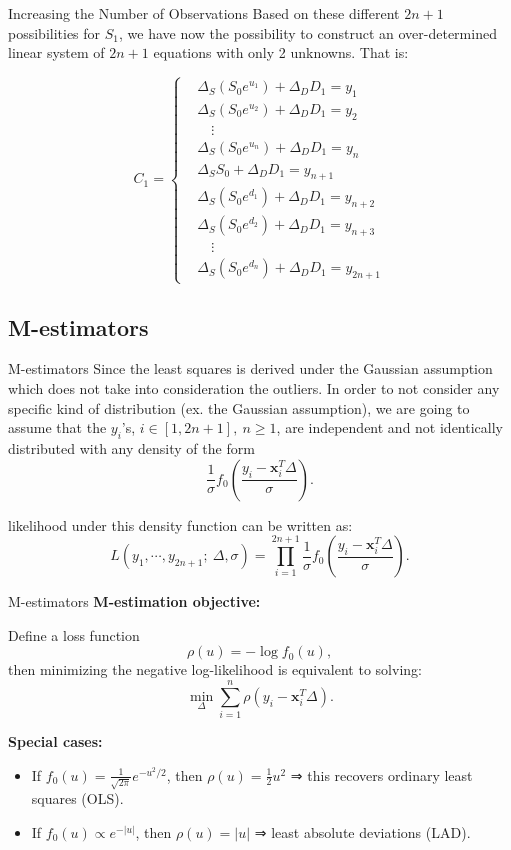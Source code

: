 \documentclass[aspectratio=169,xcolor=dvipsnames]{beamer}
\begin{document}
	\begin{frame}{Increasing the Number of Observations}
Based on these different $2n + 1$ possibilities for $S_1$, we have now the possibility to construct an over-determined linear system of $2n + 1$ equations with only 2 unknowns. That is:

\[
C_1 =
\left\{
\begin{aligned}
	&\Delta_S (S_0 e^{u_1}) + \Delta_D D_1 = y_1 \\
	&\Delta_S (S_0 e^{u_2}) + \Delta_D D_1 = y_2 \\
	&\quad\vdots \\
	&\Delta_S (S_0 e^{u_n}) + \Delta_D D_1 = y_n \\
	&\boxed{\Delta_S S_0 + \Delta_D D_1 = y_{n+1}} \\
	&\Delta_S (S_0 e^{d_1}) + \Delta_D D_1 = y_{n+2} \\
	&\Delta_S (S_0 e^{d_2}) + \Delta_D D_1 = y_{n+3} \\
	&\quad\vdots \\
	&\Delta_S (S_0 e^{d_n}) + \Delta_D D_1 = y_{2n+1}
\end{aligned}
\right.
\]
\end{frame}

\subsection{M-estimators}
\begin{frame}{M-estimators}
Since the least squares is derived under the Gaussian assumption which does not take into consideration the outliers. In order to not consider any specific kind of distribution (ex. the Gaussian assumption), we are going to assume that the $y_i$'s, $i \in [1, 2n+1],\ n \geq 1$, are independent and not identically distributed with any density of the form
\[
\frac{1}{\sigma} f_0\left( \frac{y_i - \mathbf{x}_i^T {\Delta}}{\sigma} \right).
\]

likelihood under this density function can be written as:
\[
L(y_1, \cdots, y_{2n+1};\ {\Delta}, \sigma) = \prod_{i=1}^{2n+1} \frac{1}{\sigma} f_0 \left( \frac{y_i - \mathbf{x}_i^T {\Delta}}{\sigma} \right).
\]
\end{frame}

\begin{frame}{M-estimators}
	\textbf{M-estimation objective:}
	
	Define a loss function
	\[
	\rho(u) = -\log f_0(u),
	\]
	then minimizing the negative log-likelihood is equivalent to solving:
	\[
	\min_{\Delta} \sum_{i=1}^{n} \rho\left( y_i - \mathbf{x}_i^T \Delta \right).
	\]
	
	\textbf{Special cases:}
	\begin{itemize}
		\item If \( f_0(u) = \frac{1}{\sqrt{2\pi}} e^{-u^2/2} \), then \( \rho(u) = \frac{1}{2} u^2 \) ⇒ this recovers ordinary least squares (OLS).
		\item If \( f_0(u) \propto e^{-|u|} \), then \( \rho(u) = |u| \) ⇒ least absolute deviations (LAD).
	\end{itemize}
	
	
\end{frame}
\end{document}
